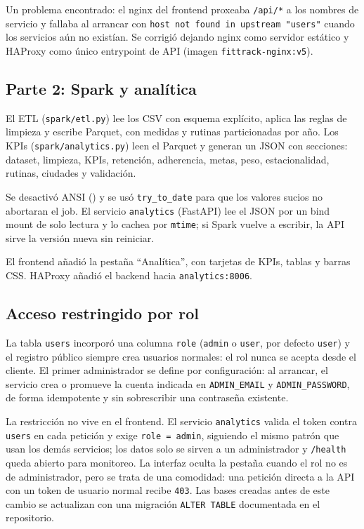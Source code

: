 \documentclass[conference]{IEEEtran}
\begin{document}
Un problema encontrado: el nginx del frontend proxeaba \texttt{/api/*} a los nombres de servicio y
fallaba al arrancar con \texttt{host not found in upstream "users"} cuando los servicios aún no
existían. Se corrigió dejando nginx como servidor estático y HAProxy como único entrypoint de API
(imagen \texttt{fittrack-nginx:v5}).

\subsection{Parte 2: Spark y analítica}
El ETL (\texttt{spark/etl.py}) lee los CSV con esquema explícito, aplica las reglas de limpieza y
escribe Parquet, con medidas y rutinas particionadas por año. Los KPIs (\texttt{spark/analytics.py}) leen el Parquet y
generan un JSON con secciones: dataset, limpieza, KPIs, retención, adherencia, metas, peso,
estacionalidad, rutinas, ciudades y validación.

Se desactivó ANSI () y se usó \texttt{try\_to\_date} para que
los valores sucios no abortaran el job. El servicio \texttt{analytics} (FastAPI) lee el JSON por un
bind mount de solo lectura y lo cachea por \texttt{mtime}; si Spark vuelve a escribir, la API sirve
la versión nueva sin reiniciar.

El frontend añadió la pestaña ``Analítica'', con tarjetas de KPIs, tablas y barras CSS. HAProxy añadió
el backend  hacia \texttt{analytics:8006}.

\subsection{Acceso restringido por rol}
La tabla \texttt{users} incorporó una columna \texttt{role} (\texttt{admin} o \texttt{user}, por
defecto \texttt{user}) y el registro público siempre crea usuarios normales: el rol nunca se acepta
desde el cliente. El primer administrador se define por configuración: al arrancar, el servicio crea o
promueve la cuenta indicada en \texttt{ADMIN\_EMAIL} y \texttt{ADMIN\_PASSWORD}, de forma idempotente y
sin sobrescribir una contraseña existente.

La restricción no vive en el frontend. El servicio \texttt{analytics} valida el token contra
\texttt{users} en cada petición y exige \texttt{role = admin}, siguiendo el mismo patrón que usan los
demás servicios; los datos solo se sirven a un administrador y \texttt{/health} queda abierto para
monitoreo. La interfaz oculta la pestaña cuando el rol no es de administrador, pero se trata de una
comodidad: una petición directa a la API con un token de usuario normal recibe \texttt{403}. Las bases creadas antes de este
cambio se actualizan con una migración \texttt{ALTER TABLE} documentada en el repositorio.
\end{document}
